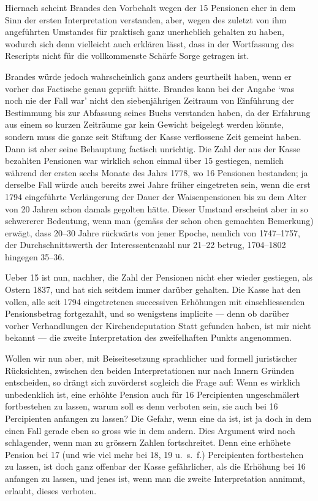 \documentclass[12pt,a4paper]{article}
\begin{document}
Hiernach scheint Brandes den Vorbehalt wegen der 15 Pensionen eher in dem Sinn der ersten Interpretation verstanden, aber, wegen des zuletzt von ihm angef\"uhrten Umstandes f\"ur praktisch ganz unerheblich gehalten zu haben, wodurch sich denn vielleicht auch erkl\"aren l\"asst, dass in der Wortfassung des Rescripts nicht f\"ur die vollkommenste Sch\"arfe Sorge getragen ist.

Brandes w\"urde jedoch wahrscheinlich ganz anders geurtheilt haben, wenn er vorher das Factische genau gepr\"uft h\"atte. Brandes kann bei der Angabe `was noch nie der Fall war' nicht den siebenj\"ahrigen Zeitraum von Einf\"uhrung der Bestimmung bis zur Abfassung seines Buchs verstanden haben, da der Erfahrung aus einem so kurzen Zeitr\"aume gar kein Gewicht beigelegt werden k\"onnte, sondern muss die ganze seit Stiftung der Kasse verflossene Zeit gemeint haben. Dann ist aber seine Behauptung factisch unrichtig. Die Zahl der aus der Kasse bezahlten Pensionen war wirklich schon einmal \"uber 15 gestiegen, nemlich w\"ahrend der ersten sechs Monate des Jahrs 1778, wo 16 Pensionen bestanden; ja derselbe Fall w\"urde auch bereits zwei Jahre fr\"uher eingetreten sein, wenn die erst 1794 eingef\"uhrte Verl\"angerung der Dauer der Waisenpensionen bis zu dem Alter von 20 Jahren schon damals gegolten h\"atte. Dieser Umstand erscheint aber in so schwererer Bedeutung, wenn man (gem\"ass der schon oben gemachten Bemerkung) erw\"agt, dass 20--30 Jahre r\"uckw\"arts von jener Epoche, nemlich von 1747--1757, der Durchschnittswerth der Interessentenzahl nur 21--22 betrug, 1704--1802 hingegen 35--36.

Ueber 15 ist nun, nachher, die Zahl der Pensionen nicht eher wieder gestiegen, als Ostern 1837, und hat sich seitdem immer dar\"uber gehalten. Die Kasse hat den vollen, alle seit 1794 eingetretenen successiven Erh\"ohungen mit einschliessenden Pensionsbetrag fortgezahlt, und so wenigstens implicite --- denn ob dar\"uber vorher Verhandlungen der Kirchendeputation Statt gefunden haben, ist mir nicht bekannt --- die zweite Interpretation des zweifelhaften Punkts angenommen.

Wollen wir nun aber, mit Beiseitesetzung sprachlicher und formell juristischer R\"ucksichten, zwischen den beiden Interpretationen nur nach Innern Gr\"unden entscheiden, so dr\"angt sich zuv\"orderst sogleich die Frage auf: Wenn es wirklich unbedenklich ist, eine erh\"ohte Pension auch f\"ur 16 Percipienten ungeschm\"alert fortbestehen zu lassen, warum soll es denn verboten sein, sie auch bei 16 Percipienten anfangen zu lassen? Die Gefahr, wenn eine da ist, ist ja doch in dem einen Fall gerade eben so gross wie in dem andern. Dies Argument wird noch schlagender, wenn man zu gr\"ossern Zahlen fortschreitet. Denn eine erh\"ohete Pension bei 17 (und wie viel mehr bei 18, 19 u.\ s.\ f.) Percipienten fortbestehen zu lassen, ist doch ganz offenbar der Kasse gef\"ahrlicher, als die Erh\"ohung bei 16 anfangen zu lassen, und jenes ist, wenn man die zweite Interpretation annimmt, erlaubt, dieses verboten.
\end{document}
